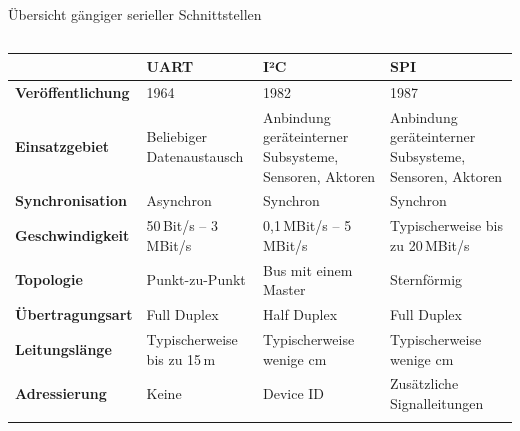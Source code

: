 {
\scriptsize
\renewcommand{\arraystretch}{1.4}
\setlength{\tabcolsep}{0.5em}

\begin{frame}{Übersicht gängiger serieller Schnittstellen}
    \begin{columns}
        \column{\dimexpr\paperwidth-28pt}
        \begin{tabular}{p{} p{} p{} p{}}
            &
            \textbf{UART} &
            \textbf{I²C} &
            \textbf{SPI} \\
            \hline

            \textbf{Veröffentlichung} &
            1964 & %
            1982 & %
            1987 \\ %

            \textbf{Einsatzgebiet} &
            Beliebiger Datenaustausch & %
            Anbindung geräteinterner Subsysteme, Sensoren, Aktoren & %
            Anbindung geräteinterner Subsysteme, Sensoren, Aktoren \\ %

            \textbf{Synchronisation} &
            Asynchron & %
            Synchron & %
            Synchron \\ %

            \textbf{Geschwindigkeit} &
            50\,Bit/s -- 3\,MBit/s & %
            0,1\,MBit/s -- 5\,MBit/s & %
            Typischerweise bis zu 20\,MBit/s \\ %

            \textbf{Topologie} &
            Punkt-zu-Punkt & %
            Bus mit einem Master & %
            Sternförmig \\ %

            \textbf{Übertragungsart} &
            Full Duplex & %
            Half Duplex & %
            Full Duplex \\ %

            \textbf{Leitungslänge} &
            Typischerweise bis zu 15\,m & %
            Typischerweise wenige cm & %
            Typischerweise wenige cm \\ %

            \textbf{Adressierung} &
            Keine & %
            Device ID & %
            Zusätzliche Signalleitungen \\ %

            \\


\end{tabular}
\end{columns}
\end{frame}}
